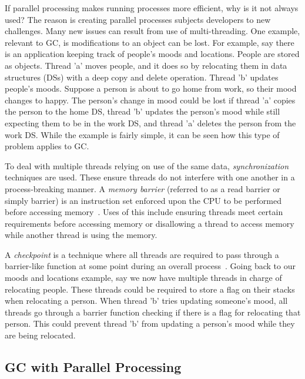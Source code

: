 \documentclass{sig-alternate}
\begin{document}
If parallel processing makes running processes more efficient, why is it not
always used? The reason is creating parallel processes subjects
developers to new challenges. Many new issues can result from use of
multi-threading. One example, relevant to GC, is modifications to an 
object can be lost. For example, say there is an application keeping 
track of people's moods and locations. People are stored as objects. 
Thread 'a' moves people, and it does so by relocating them in data structures (DSs) 
with a deep copy and delete operation. Thread 'b' updates people's moods. Suppose a person
is about to go home from work, so their mood changes to happy.
The person's change in mood could be lost if thread 'a' copies the person
to the home DS, thread 'b' updates the person's mood while still expecting
them to be in the work DS, and thread 'a' deletes the person from the work DS. 
While the example is fairly simple, it can be seen how this type of problem
applies to GC.

To deal with multiple threads relying on use of the same data, \emph{synchronization}
techniques are used. These ensure threads do not interfere
with one another in a process-breaking manner. A \emph{memory barrier} (referred to 
as a read barrier or simply barrier) is an instruction set enforced upon the 
CPU to be performed before accessing memory~\cite{wiki:barrier}. Uses of this include ensuring threads
meet certain requirements before accessing memory or disallowing a thread to
access memory while another thread is using the memory.
 
A \emph{checkpoint} is a technique
where all threads are required to pass through a barrier-like function at some point
during an overall process~\cite{Tene:C4}. Going back to our moods and locations example, say we
now have multiple threads in charge of relocating people. These threads
could be required to store a flag on their stacks when relocating a person.
When thread 'b' tries updating someone's mood, all threads go through
a barrier function checking if there is a flag for relocating that person. This
could prevent thread 'b' from updating a person's mood while they are being relocated.


\subsection{GC with Parallel Processing}
\label{sec:parallelProcessingGarbageCollection}
\end{document}
